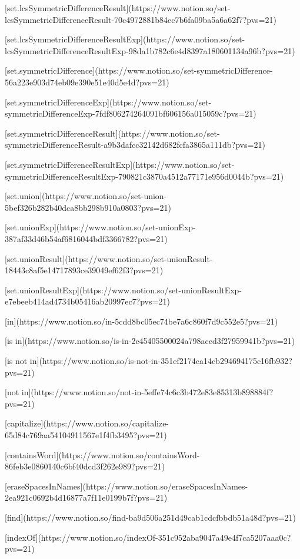[set.lcsSymmetricDifferenceResult](https://www.notion.so/set-lcsSymmetricDifferenceResult-70c4972881b84ec7b6fa09ba5a6a62f7?pvs=21)

[set.lcsSymmetricDifferenceResultExp](https://www.notion.so/set-lcsSymmetricDifferenceResultExp-98da1b782c6e4d8397a180601134a96b?pvs=21)

[set.symmetricDifference](https://www.notion.so/set-symmetricDifference-56a223e903d74eb09e390e51e40d5e4d?pvs=21)

[set.symmetricDifferenceExp](https://www.notion.so/set-symmetricDifferenceExp-7fdf806274264091bf606156a015059c?pvs=21)

[set.symmetricDifferenceResult](https://www.notion.so/set-symmetricDifferenceResult-a9b3dafcc32142d682fcfa3865a111db?pvs=21)

[set.symmetricDifferenceResultExp](https://www.notion.so/set-symmetricDifferenceResultExp-790821c3870a4512a77171e956d0044b?pvs=21)

[set.union](https://www.notion.so/set-union-5bef326b282b40dca8bb298b910a0803?pvs=21)

[set.unionExp](https://www.notion.so/set-unionExp-387af33d46b54af6816044bdf3366782?pvs=21)

[set.unionResult](https://www.notion.so/set-unionResult-18443c8af5e14717893ce39049ef62f3?pvs=21)

[set.unionResultExp](https://www.notion.so/set-unionResultExp-e7ebeeb414ad4734b05416ab20997ec7?pvs=21)

[in](https://www.notion.so/in-5cdd8bc05ec74be7a6c860f7d9c552e5?pvs=21)

[is in](https://www.notion.so/is-in-2e45405500024a798accd3f27959941b?pvs=21)

[is not in](https://www.notion.so/is-not-in-351ef2174ca14cb294694175c16fb932?pvs=21)

[not in](https://www.notion.so/not-in-5effe74c6c3b472e83e85313b898884f?pvs=21)

[capitalize](https://www.notion.so/capitalize-65d84c769aa54104911567e1f4fb3495?pvs=21)

[containsWord](https://www.notion.so/containsWord-86feb3e0860140c6bf40dcd3f262e989?pvs=21)

[eraseSpacesInNames](https://www.notion.so/eraseSpacesInNames-2ea921c0692b4d16877a7f11e0199b7f?pvs=21)

[find](https://www.notion.so/find-ba9d506a251d49cab1cdcfbbdb51a48d?pvs=21)

[indexOf](https://www.notion.so/indexOf-351c952aba9047a49e4f7ca5207aaa0c?pvs=21)

